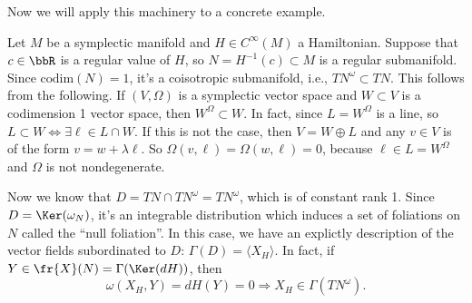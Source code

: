 Now we will apply this machinery to a concrete example.
\begin{example}
    Let $M$ be a symplectic manifold and $H\in C^\infty(M)$ a Hamiltonian. Suppose that $c\in\bbR$ is a regular 
    value of $H$, so $N=H^{-1}(c)\subset M$ is a regular submanifold. Since $\text{codim}(N)=1$, it's a coisotropic 
    submanifold, i.e., $TN^\omega\subset TN$. This follows from the following. If $(V,\Omega)$ is a symplectic vector space 
    and $W\subset V$ is a codimension 1 vector space, then $W^\Omega\subset W$. In fact, since $L=W^\Omega$ is a line, so 
    $L\subset W\iff \exists \ell\in L\cap W$. If this is not the case, then $V=W\oplus L$ and any $v\in V$ is of the form 
    $v=w+\lambda\ell$. So $\Omega(v,\ell)=\Omega(w,\ell)=0$, because $\ell\in L=W^\Omega$ and $\Omega$ is not nondegenerate.\par 

    Now we know that $D=TN\cap TN^\omega=TN^\omega$, which is of constant rank 1. Since $D=\Ker(\omega_N)$, it's an 
    integrable distribution which induces a set of foliations on $N$ called the ``null foliation''. In this case, we 
    have an explictly description of the vector fields subordinated to $D$: $\Gamma(D)=\langle X_H \rangle$. 
    In fact, if $Y\in \fr{X}(N)=\Gamma(\Ker(dH))$, then 
    \begin{equation}
        \omega(X_H,Y)=dH(Y)=0\Rightarrow X_H\in\Gamma(TN^\omega).
    \end{equation}


\end{example}
